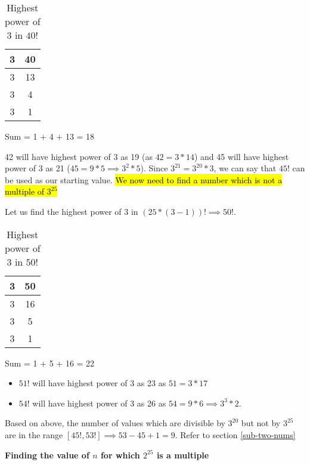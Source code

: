 \begin{table}[ht!]
    \centering
    \begin{tabular}{|| c | c ||}
         \textbf{3} & \textbf{40}  \\
         \hline 
         3 & 13 \\
         3 & 4 \\
         3 & 1 \\
    \end{tabular}
    \caption{Highest power of 3 in $40!$}
\end{table}

Sum = 1 + 4 + 13 = 18

42 will have highest power of 3 as 19 (as $42 = 3 * 14$) and 45 will have highest power of 3 as 21 ($45 = 9 * 5 \implies 3^2 * 5$). Since $3^{21} = 3^{20} * 3$, we can say that $45!$ can be used as our starting value. \hl{We now need to find a number which is not a multiple of $3^{25}$}    

Let us find the highest power of 3 in $( 25 * (3-1))! \implies 50!$. 

\begin{table}[ht!]
    \centering
    \begin{tabular}{|| c | c ||}
         \textbf{3} & \textbf{50}  \\
         \hline 
         3 & 16 \\
         3 & 5 \\
         3 & 1 \\
    \end{tabular}
    \caption{Highest power of 3 in $50!$}
\end{table}

Sum = 1 + 5 + 16 = 22

\begin{itemize}
    \item $51!$ will have highest power of 3 as 23 as $51 = 3 * 17$
    \item $54!$ will have highest power of 3 as 26 as $54 = 9 * 6 \implies 3^3 * 2$. 
\end{itemize}

Based on above, the number of values which are divisible by $3^{20}$ but not by $3^{25}$ are in the range $\displaystyle \left [ 45!,53! \right ] \implies 53 - 45 + 1 = 9$. Refer to section \ref{sub-two-nums} 


\textbf{Finding the value of $n$ for which $2^{25}$ is a multiple}

